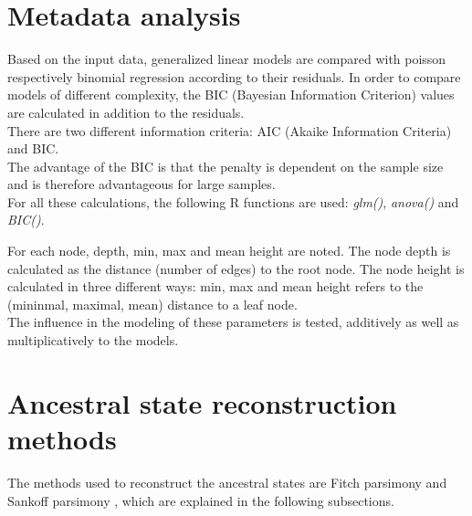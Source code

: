   \section{Metadata analysis} \label{sec:methods - metadata analysis}
    Based on the input data, generalized linear models are compared with poisson respectively binomial 
      regression according to their residuals. In order to compare models of different complexity, the 
      BIC (Bayesian Information Criterion) values are calculated in addition to the residuals. \\
    There are two different information criteria: AIC (Akaike Information Criteria) and BIC. \\
    The advantage of the BIC is that the penalty is dependent on the sample size and is therefore 
      advantageous for large samples. \\
    For all these calculations, the following R functions are  used: \textit{glm()}, \textit{anova()} 
      and \textit{BIC()}.

    For each node, depth, min, max and mean height are  noted. The node depth is calculated as the
      distance (number of edges) to the root node. The node height is calculated in three different 
      ways: min, max and mean height refers to the (mininmal, maximal, mean) distance to a leaf node. \\
    The influence in the modeling of these parameters is tested, additively as well as 
      multiplicatively to the models.

  \section{Ancestral state reconstruction methods} \label{sec:methods - ancestral state reconstruction}
    The methods used to reconstruct the ancestral states are Fitch parsimony \cite{Fitch1971} and 
      Sankoff parsimony \cite{Sankoff1975}, which are explained in the following subsections.

